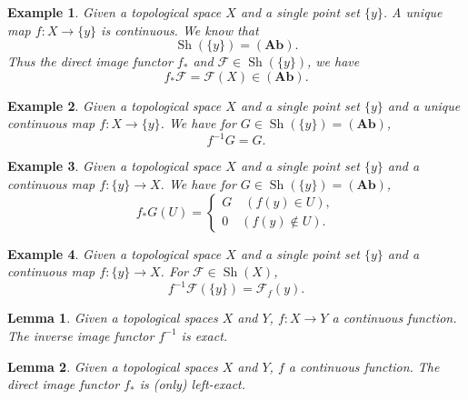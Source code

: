 \documentclass{article}
\newtheorem{lemma}{Lemma}[section]
\newtheorem{example}{Example}[section]
\numberwithin{equation}{section}
\DeclareMathOperator{\Sh}{Sh}
\begin{document}
\begin{example}
Given a topological space $X$ and a single point set $\{y\}$. A unique map $f:X\to \{y\}$ is continuous. We know that 
\begin{equation*}
\Sh(\{y\}) = (\mathbf{Ab}).
\end{equation*}
Thus the direct image functor $f_*$ and $\mathcal{F}\in\Sh(\{y\})$, we have
\begin{equation*}
f_*\mathcal{F} =  \mathcal{F}(X)\in(\mathbf{Ab}).
\end{equation*}
\end{example}

\begin{example}
Given a topological space $X$ and a single point set $\{y\}$ and a unique continuous map $f:X\to \{y\}$. We have for $G\in\Sh(\{y\}) = (\mathbf{Ab})$, 
\begin{equation*}
f^{-1}G = G.
\end{equation*}
\end{example}

\begin{example}
Given a topological space $X$ and a single point set $\{y\}$ and a continuous map $f: \{y\}\to X$. We have for $G\in\Sh(\{y\}) = (\mathbf{Ab})$, 
\begin{equation*}
f_*G(U) = 
\begin{cases}
G\quad (f(y)\in U),\\
0\quad (f(y)\not\in U).
\end{cases}
\end{equation*}
\end{example}

\begin{example}
Given a topological space $X$ and a single point set $\{y\}$ and a continuous map $f: \{y\}\to X$. For $\mathcal{F}\in\Sh(X)$,
\begin{equation*}
f^{-1}\mathcal{F}(\{y\}) = \mathcal{F}_f(y).
\end{equation*}
\end{example}

\begin{lemma}
Given a topological spaces $X$ and $Y$, $f:X\to Y$ a continuous function. The inverse image functor $f^{-1}$ is exact. 
\end{lemma}

\begin{lemma}
Given a topological spaces $X$ and $Y$, $f$ a continuous function. The direct image functor $f_*$ is (only) left-exact.
\end{lemma}
\end{document}
